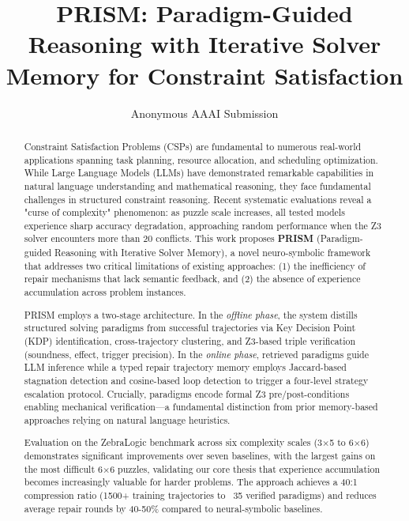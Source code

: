 \documentclass[letterpaper]{article}
\title{PRISM: Paradigm-Guided Reasoning with Iterative Solver Memory for Constraint Satisfaction}
\author{
Anonymous AAAI Submission
}
\begin{document}
\maketitle

\begin{abstract}
Constraint Satisfaction Problems (CSPs) are fundamental to numerous real-world applications spanning task planning, resource allocation, and scheduling optimization. While Large Language Models (LLMs) have demonstrated remarkable capabilities in natural language understanding and mathematical reasoning, they face fundamental challenges in structured constraint reasoning. Recent systematic evaluations reveal a "curse of complexity" phenomenon: as puzzle scale increases, all tested models experience sharp accuracy degradation, approaching random performance when the Z3 solver encounters more than 20 conflicts. This work proposes \textbf{PRISM} (Paradigm-guided Reasoning with Iterative Solver Memory), a novel neuro-symbolic framework that addresses two critical limitations of existing approaches: (1) the inefficiency of repair mechanisms that lack semantic feedback, and (2) the absence of experience accumulation across problem instances.

PRISM employs a two-stage architecture. In the \textit{offline phase}, the system distills structured solving paradigms from successful trajectories via Key Decision Point (KDP) identification, cross-trajectory clustering, and Z3-based triple verification (soundness, effect, trigger precision). In the \textit{online phase}, retrieved paradigms guide LLM inference while a typed repair trajectory memory employs Jaccard-based stagnation detection and cosine-based loop detection to trigger a four-level strategy escalation protocol. Crucially, paradigms encode formal Z3 pre/post-conditions enabling mechanical verification—a fundamental distinction from prior memory-based approaches relying on natural language heuristics.

Evaluation on the ZebraLogic benchmark across six complexity scales (3×5 to 6×6) demonstrates significant improvements over seven baselines, with the largest gains on the most difficult 6×6 puzzles, validating our core thesis that experience accumulation becomes increasingly valuable for harder problems. The approach achieves a 40:1 compression ratio (1500+ training trajectories to ~35 verified paradigms) and reduces average repair rounds by 40-50\% compared to neural-symbolic baselines.
\end{abstract}
\end{document}
